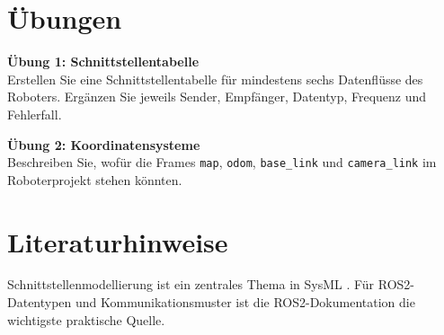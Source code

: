 \section{Übungen}
\begin{uebungbox}
\textbf{Übung 1: Schnittstellentabelle}\\
Erstellen Sie eine Schnittstellentabelle für mindestens sechs Datenflüsse des Roboters. Ergänzen Sie jeweils Sender, Empfänger, Datentyp, Frequenz und Fehlerfall.
\end{uebungbox}

\begin{uebungbox}
\textbf{Übung 2: Koordinatensysteme}\\
Beschreiben Sie, wofür die Frames \texttt{map}, \texttt{odom}, \texttt{base\_link} und \texttt{camera\_link} im Roboterprojekt stehen könnten.
\end{uebungbox}

\section{Literaturhinweise}
Schnittstellenmodellierung ist ein zentrales Thema in SysML \cite{friedenthal2014}. Für ROS2-Datentypen und Kommunikationsmuster ist die ROS2-Dokumentation \cite{ros2docs} die wichtigste praktische Quelle.
